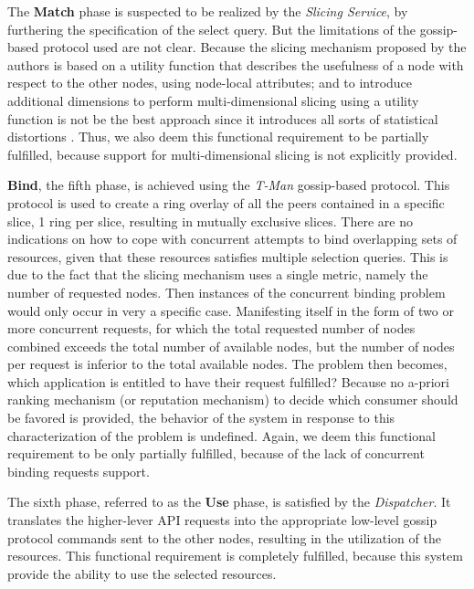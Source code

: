 \documentclass[12pt, titlepage]{uo_temp}
\begin{document}
     The \textbf{Match} phase is suspected to be realized by the \emph{Slicing Service},
     by furthering the specification of the select query. But the limitations of the
     gossip-based protocol used are not clear. Because the slicing mechanism proposed by
     the authors is based on a utility function that describes the usefulness of a node
     with respect to the other nodes, using node-local attributes; and to introduce
     additional dimensions to perform multi-dimensional slicing using a utility function
     is not be the best approach since it introduces all sorts of statistical distortions
     \cite{pasquet2014autonomous}. Thus, we also deem this functional requirement to be
     partially fulfilled, because support for multi-dimensional slicing is not explicitly
     provided.

     \textbf{Bind}, the fifth phase, is achieved using the \emph{T-Man} gossip-based
     protocol. This protocol is used to create a ring overlay of all the peers contained
     in a specific slice, 1 ring per slice, resulting in mutually exclusive slices. There
     are no indications on how to cope with concurrent attempts to bind overlapping sets
     of resources, given that these resources satisfies multiple selection queries. This
     is due to the fact that the slicing mechanism uses a single
     metric, namely the number of requested nodes. Then instances of the concurrent binding
     problem would only occur in very a specific case. Manifesting itself in the
     form of two or more concurrent requests, for which the total requested number of nodes
     combined exceeds the total number of available nodes, but the number of nodes
     per request is inferior to the total available nodes. The problem then becomes,
     which application is entitled to have their request fulfilled? Because no a-priori
     ranking mechanism (or reputation mechanism) to decide which consumer should be
     favored is provided, the behavior of the system in response to this characterization of the
     problem is undefined. Again, we deem this functional requirement to be only partially
     fulfilled, because of the lack of concurrent binding requests support.

     The sixth phase, referred to as the \textbf{Use} phase, is satisfied by the
     \emph{Dispatcher}. It translates the higher-lever API requests into the appropriate
     low-level gossip protocol commands sent to the other nodes, resulting in the
     utilization of the resources. This functional requirement is completely fulfilled,
     because this system provide the ability to use the selected resources.
\end{document}
